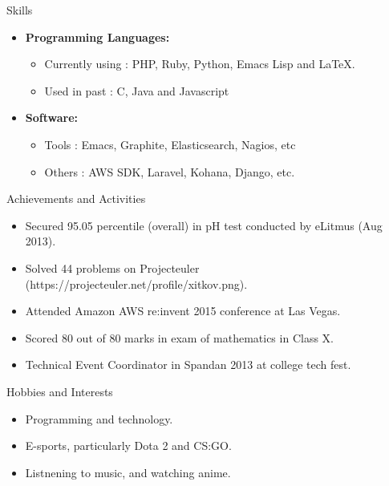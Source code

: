 \documentclass[11pt,oneside]{article}
\newenvironment{ressection}[1]{
  \vspace{4pt}
         {\fontfamily{phv}\selectfont\Large#1}
         \begin{itemize}
           \vspace{3pt}
}{
         \end{itemize}
}
\newcommand{\resitem}[1]{
  \vspace{-4pt}
\item \begin{flushleft} #1 \end{flushleft}
}
\newcommand{\ressubitem}[1]{
  \vspace{-1pt}
\item \begin{flushleft} #1 \end{flushleft}
}
\newenvironment{reslist}[1]{
  \resitem{\textbf{#1}}
  \vspace{-5pt}
  \begin{itemize}
}{
  \end{itemize}
}
\begin{document}

\begin{ressection}{Skills}
  \begin{reslist}{Programming Languages:}
    \ressubitem{Currently using : PHP, Ruby, Python, Emacs Lisp and \LaTeX.}
    \ressubitem{Used in past : C, Java and Javascript}
  \end{reslist}
  \begin{reslist}{Software:}
    \ressubitem{Tools : Emacs, Graphite, Elasticsearch, Nagios, etc}
    \ressubitem{Others : AWS SDK, Laravel, Kohana, Django, etc.}
  \end{reslist}
\end{ressection}


\begin{ressection}{Achievements and Activities}
  \resitem{Secured 95.05 percentile (overall) in pH test conducted by eLitmus (Aug 2013).}
  \resitem{Solved 44 problems on Projecteuler (https://projecteuler.net/profile/xitkov.png).}
  \resitem{Attended Amazon AWS re:invent 2015 conference at Las Vegas.}
  \resitem{Scored 80 out of 80 marks in exam of mathematics in Class X.}
  \resitem{Technical Event Coordinator in Spandan 2013 at college tech fest.}
\end{ressection}


\begin{ressection}{Hobbies and Interests}
  \resitem{Programming and technology.}
  \resitem{E-sports, particularly Dota 2 and CS:GO.}
  \resitem{Listnening to music, and watching anime.}
\end{ressection}
\end{document}
